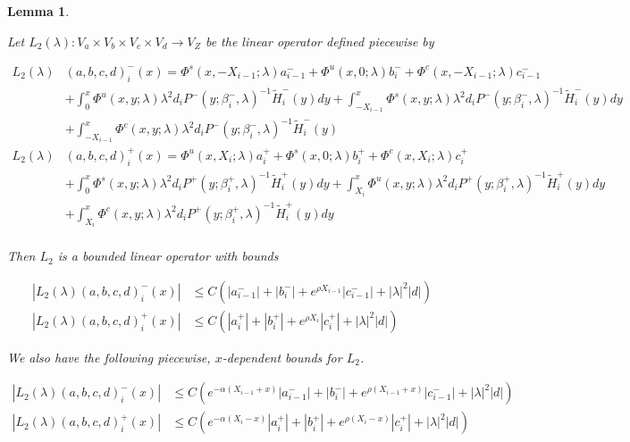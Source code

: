 \documentclass[12pt]{article}
\newtheorem{lemma}{Lemma}
\begin{document}
\begin{lemma}\label{L2}

Let $L_2(\lambda): V_a \times V_b \times V_c \times V_d \rightarrow V_Z$ be the linear operator defined piecewise by

\begin{align*}
L_2(\lambda)&(a,b,c,d)_i^-(x) = \Phi^s(x, -X_{i-1}; \lambda) a_{i-1}^- + \Phi^u(x, 0; \lambda) b_i^- + \Phi^c(x, -X_{i-1}; \lambda) c_{i-1}^- \\
&+ \int_0^x \Phi^u(x, y; \lambda) \lambda^2 d_i P^-(y; \beta_i^-, \lambda)^{-1} \tilde{H}_i^-(y) dy
+ \int_{-X_{i-1}}^x \Phi^s(x, y; \lambda) \lambda^2 d_i P^-(y; \beta_i^-, \lambda)^{-1} \tilde{H}_i^-(y) dy \\
&+ \int_{-X_{i-1}}^x \Phi^c(x, y; \lambda) \lambda^2 d_i P^-(y; \beta_i^-, \lambda)^{-1} \tilde{H}_i^-(y) \\
L_2(\lambda)&(a,b,c,d)_i^+(x) = \Phi^u(x, X_i; \lambda) a_i^+ + \Phi^s(x, 0; \lambda) b_i^+ + \Phi^c(x, X_i; \lambda) c_i^+ \\
&+ \int_0^x \Phi^s(x, y; \lambda) \lambda^2 d_i P^+(y; \beta_i^+, \lambda)^{-1} \tilde{H}_i^+(y) dy + \int_{X_i}^x \Phi^u(x, y; \lambda) \lambda^2 d_i P^+(y; \beta_i^+, \lambda)^{-1} \tilde{H}_i^+(y) dy \\
&+ \int_{X_i}^x \Phi^c(x, y; \lambda) \lambda^2 d_i P^+(y; \beta_i^+, \lambda)^{-1} \tilde{H}_i^+(y) dy \\
\end{align*}

Then $L_2$ is a bounded linear operator with bounds

\begin{align*}
|L_2(\lambda)(a,b,c,d)_i^-(x)| &\leq C (|a_{i-1}^-| + |b_i^-| + e^{\rho X_{i-1}} |c_{i-1}^-| + |\lambda|^2 |d| ) \\
|L_2(\lambda)(a,b,c,d)_i^+(x)| &\leq C (|a_i^+| + |b_i^+| + e^{\rho X_i} |c_i^+| + |\lambda|^2 |d| ) 
\end{align*}

We also have the following piecewise, $x$-dependent bounds for $L_2$.

\begin{align*}
|L_2(\lambda)(a,b,c,d)_i^-(x)| &\leq C (e^{-\alpha(X_{i-1} + x)}|a_{i-1}^-| + |b_i^-| + e^{\rho(X_{i-1} + x)} |c_{i-1}^-| + |\lambda|^2 |d| ) \\
|L_2(\lambda)(a,b,c,d)_i^+(x)| &\leq C (e^{-\alpha(X_i - x)}|a_i^+| + |b_i^+| + e^{\rho(X_i - x)} |c_i^+| + |\lambda|^2 |d| ) 
\end{align*}


\end{lemma}
\end{document}
